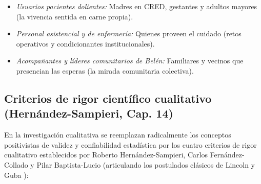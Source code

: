 \begin{enumerate}
    \begin{itemize}
        \item \textit{Usuarios pacientes dolientes:} Madres en CRED, gestantes y adultos mayores (la vivencia sentida en carne propia).
        \item \textit{Personal asistencial y de enfermería:} Quienes proveen el cuidado (retos operativos y condicionantes institucionales).
        \item \textit{Acompañantes y líderes comunitarios de Belén:} Familiares y vecinos que presencian las esperas (la mirada comunitaria colectiva).
    \end{itemize}
\end{enumerate}

\subsection{Criterios de rigor científico cualitativo (Hernández-Sampieri, Cap. 14)}
\label{sec:4.6_rigor}
En la investigación cualitativa se reemplazan radicalmente los conceptos positivistas de validez y confiabilidad estadística por los cuatro criterios de rigor cualitativo establecidos por Roberto Hernández-Sampieri, Carlos Fernández-Collado y Pilar Baptista-Lucio \cite{sampieri2018} (articulando los postulados clásicos de Lincoln y Guba \cite{gubalincoln1985}):

